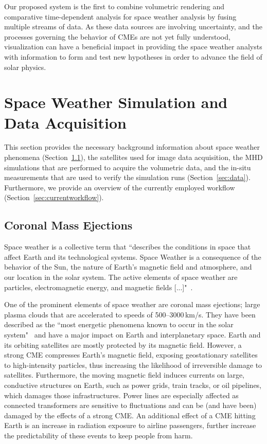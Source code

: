 \documentclass[journal]{vgtc}                %
\begin{document}
Our proposed system is the first to combine volumetric rendering and comparative time-dependent analysis for space weather analysis by fusing multiple streams of data. As these data sources are involving uncertainty, and the processes governing the behavior of CMEs are not yet fully understood, visualization can have a beneficial impact in providing the space weather analysts with information to form and test new hypotheses in order to advance the field of solar physics.  

\section{Space Weather Simulation and Data Acquisition}
This section provides the necessary background information about space weather phenomena (Section~\ref{sec:spaceweather}), the satellites used for image data acquisition, the MHD simulations that are performed to acquire the volumetric data, and the in-situ measurements that are used to verify the simulation runs (Section~\ref{sec:data}). Furthermore, we provide an overview of the currently employed workflow (Section~\ref{sec:currentworkflow}).

\subsection{Coronal Mass Ejections} \label{sec:spaceweather}
Space weather is a collective term that ``describes the conditions in space that affect Earth and its technological systems. Space Weather is a consequence of the behavior of the Sun, the nature of Earth’s magnetic field and atmosphere, and our location in the solar system. The active elements of space weather are particles, electromagnetic energy, and magnetic fields [...]"~\cite{noaaprofile}.

One of the prominent elements of space weather are coronal mass ejections; large plasma clouds that are accelerated to speeds of 500--3000\,km/s. They have been described as the ``most energetic phenomena known to occur in the solar system"~\cite{Kahler:1987jt} and have a major impact on Earth and interplanetary space. Earth and its orbiting satellites are mostly protected by its magnetic field. However, a strong CME compresses Earth's magnetic field, exposing geostationary satellites to high-intensity particles, thus increasing the likelihood of irreversible damage to satellites. Furthermore, the moving magnetic field induces currents on large, conductive structures on Earth, such as power grids, train tracks, or oil pipelines, which damages those infrastructures. Power lines are especially affected as connected transformers are sensitive to fluctuations and can be (and have been) damaged by the effects of a strong CME. An additional effect of a CME hitting Earth is an increase in radiation exposure to airline passengers, further increase the predictability of these events to keep people from harm.
\end{document}
